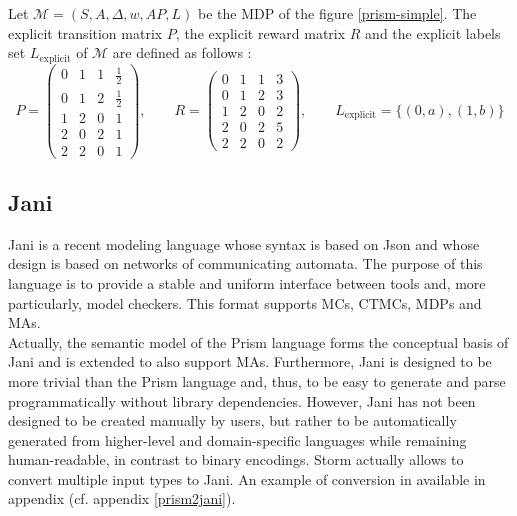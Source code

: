 \begin{example}
Let $\mathcal{M}=(S, A, \Delta, w, AP, L)$ be the MDP of the figure \ref{prism-simple}. The explicit transition matrix $P$, the explicit reward matrix $R$ and the explicit labels set $L_\text{explicit}$ of $\mathcal{M}$ are defined as follows :
  \begin{equation*}
  P =
  	\begin{pmatrix}
  	0 & 1 & 1 & \frac{1}{2} \\[0.3em]
  	0 & 1 & 2 & \frac{1}{2} \\[0.3em]
  	1 & 2 & 0 & 1 \\[0.3em]
    2 & 0 & 2 & 1 \\[0.3em]
    2 & 2 & 0 & 1
  	\end{pmatrix}, \quad \quad
  R =
    \begin{pmatrix}
  	0 & 1 & 1 & 3 \\[0.3em]
  	0 & 1 & 2 & 3 \\[0.3em]
  	1 & 2 & 0 & 2 \\[0.3em]
    2 & 0 & 2 & 5 \\[0.3em]
    2 & 2 & 0 & 2
    \end{pmatrix}, \quad \quad
  L_\text{explicit} = \{ (0, a), (1, b) \}
  \end{equation*}
\end{example}

\subsection{Jani}
Jani \cite{JQM} is a recent modeling language whose syntax is based on Json and whose design is based on networks of communicating automata.
The purpose of this language is to provide a stable and uniform interface
between tools and, more particularly, model checkers.
This format supports MCs, CTMCs, MDPs and MAs. \\

Actually, the semantic model of the Prism language forms the conceptual basis of
Jani and is extended to also support MAs.
Furthermore, Jani is designed to be more trivial than the Prism language and, thus,
to be easy to generate and parse programmatically without library dependencies.
However, Jani has not been designed to be created manually by users, but rather
to be automatically generated from higher-level and domain-specific languages while remaining human-readable, in contrast to binary encodings. Storm actually allows to
convert multiple input types to Jani. An example of conversion in available in appendix (cf. appendix \ref{prism2jani}).
